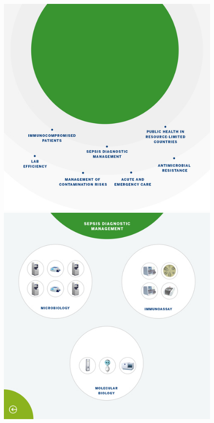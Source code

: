 \begin{figure}[h]
    \centering
    \includegraphics[scale=0.195]{img/resized-bmx-1-new.jpg}
    \includegraphics[scale=0.195]{img/resized-bmx-2-new.jpg}

\end{figure}
